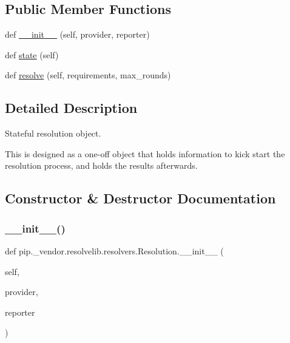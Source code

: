 \subsection*{Public Member Functions}
\begin{DoxyCompactItemize}
\item 
def \hyperlink{classpip_1_1__vendor_1_1resolvelib_1_1resolvers_1_1Resolution_a59fe89f4da6633b7105f3de512aac606}{\+\_\+\+\_\+init\+\_\+\+\_\+} (self, provider, reporter)
\item 
def \hyperlink{classpip_1_1__vendor_1_1resolvelib_1_1resolvers_1_1Resolution_ac48828944a942a40c58f3b6f0fb8781a}{state} (self)
\item 
def \hyperlink{classpip_1_1__vendor_1_1resolvelib_1_1resolvers_1_1Resolution_ab753d46c8fb1eaa2909f12ef51d67b0f}{resolve} (self, requirements, max\+\_\+rounds)
\end{DoxyCompactItemize}


\subsection{Detailed Description}
\begin{DoxyVerb}Stateful resolution object.

This is designed as a one-off object that holds information to kick start
the resolution process, and holds the results afterwards.
\end{DoxyVerb}
 

\subsection{Constructor \& Destructor Documentation}
\mbox{\label{classpip_1_1__vendor_1_1resolvelib_1_1resolvers_1_1Resolution_a59fe89f4da6633b7105f3de512aac606}} 
\subsubsection{\texorpdfstring{\+\_\+\+\_\+init\+\_\+\+\_\+()}{\_\_init\_\_()}}
{\footnotesize\ttfamily def pip.\+\_\+vendor.\+resolvelib.\+resolvers.\+Resolution.\+\_\+\+\_\+init\+\_\+\+\_\+ (\begin{DoxyParamCaption}\item[{}]{self,  }\item[{}]{provider,  }\item[{}]{reporter }\end{DoxyParamCaption})}



